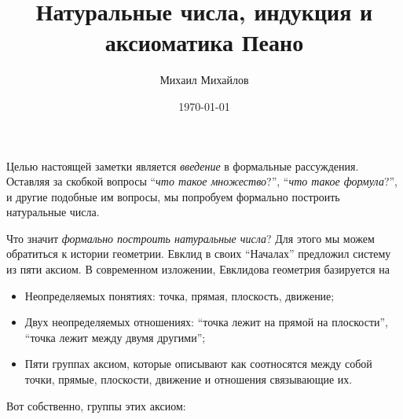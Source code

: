\documentclass{article}
\title{Натуральные числа, индукция и аксиоматика Пеано}
\author{Михаил Михайлов}
\date{\today}
\begin{document}
\maketitle
\tableofcontents

\newpage
Целью настоящей заметки является \textit{введение} в формальные рассуждения. Оставляя за скобкой вопросы \enquote{\textit{что такое множество}?}, \enquote{\textit{что такое формула}?}, и другие подобные им вопросы, мы попробуем формально построить натуральные числа. 

Что значит \textit{формально построить натуральные числа}? Для этого мы можем обратиться к истории геометрии. Евклид в своих \enquote{Началах} предложил систему из пяти аксиом. В современном изложении, Евклидова геометрия базируется на 
\begin{itemize}[noitemsep, parsep=0pt, topsep=0pt]
    \item Неопределяемых понятиях: точка, прямая, плоскость, движение;
    \item Двух неопределяемых отношениях: \enquote{точка лежит на прямой на плоскости}, \enquote{точка лежит между двумя другими};
    \item Пяти группах аксиом, которые описывают как соотносятся между собой точки, прямые, плоскости, движение и отношения связывающие их.
\end{itemize}
Вот собственно, группы этих аксиом:
\end{document}
